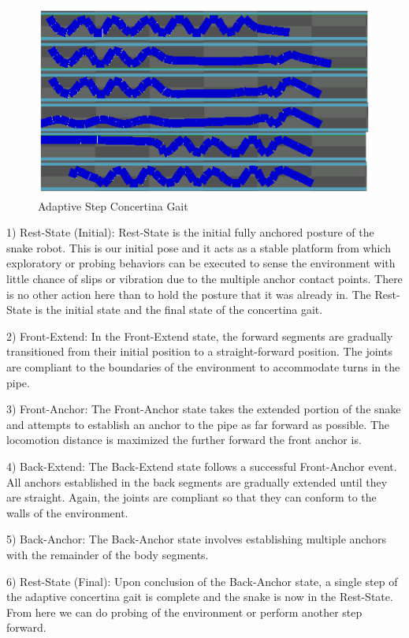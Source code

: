 \begin{figure}
\begin{center}
\includegraphics[scale=0.8]{AdaptiveStep.png}
\end{center}
\caption{Adaptive Step Concertina Gait}
\label{adaptive_step}
\end{figure}

1) Rest-State (Initial): Rest-State is the initial fully anchored posture of the snake robot.  This is our initial pose and it acts as a stable platform from which exploratory or probing behaviors can be executed to sense the environment with little chance of slips or vibration due to the multiple anchor contact points.  There is no other action here than to hold the posture that it was already in.  The Rest-State is the initial state and the final state of the concertina gait.

2) Front-Extend:  In the Front-Extend state, the forward segments are gradually transitioned from their initial position to a straight-forward position.  The joints are compliant to the boundaries of the environment to accommodate turns in the pipe.

3) Front-Anchor:  The Front-Anchor state takes the extended portion of the snake and attempts to establish an anchor to the pipe as far forward as possible.  The locomotion distance is maximized the further forward the front anchor is.

4) Back-Extend:  The Back-Extend state follows a successful Front-Anchor event.  All anchors established in the back segments are gradually extended until they are straight.  Again, the joints are compliant so that they can conform to the walls of the environment.

5) Back-Anchor:  The Back-Anchor state involves establishing multiple anchors with the remainder of the body segments.

6) Rest-State (Final):  Upon conclusion of the Back-Anchor state, a single step of the adaptive concertina gait is complete and the snake is now in the Rest-State.  From here we can do probing of the environment or perform another step forward.

